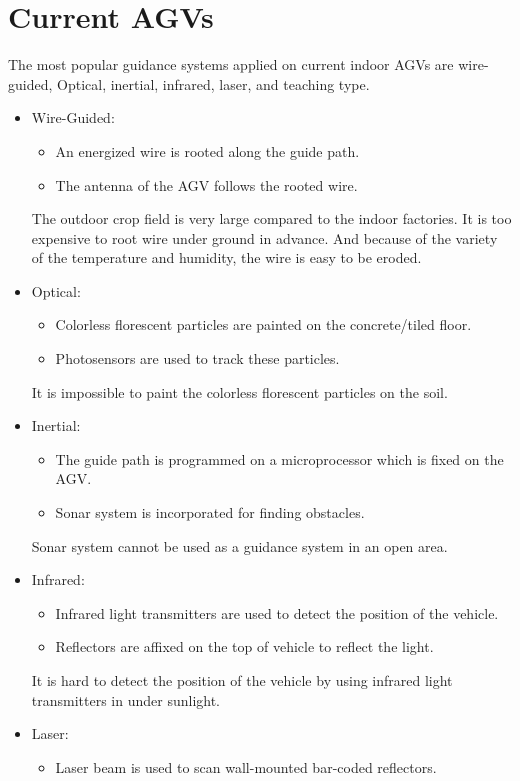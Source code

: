 \documentclass[letterpaper,12pt,oneside]{book}
\begin{document}
		\section{Current AGVs}
		The most popular guidance systems applied on current indoor AGVs are wire-guided, Optical, inertial, infrared, laser, and teaching type. \cite{KESH}
		\begin{itemize}
			\item Wire-Guided:
			\begin{itemize}
				\item An energized wire is rooted along the guide path. 
				\item The antenna of the AGV follows the rooted wire.
			\end{itemize}
			The outdoor crop field is very large compared to the indoor factories. It is too expensive to root wire under ground in advance. And because of the variety of the temperature and humidity, the wire is easy to be eroded.
			\item Optical:
			\begin{itemize}
				\item Colorless florescent particles are painted on the concrete/tiled floor. 
				\item Photosensors are used to track these particles.
			\end{itemize}
			It is impossible to paint the colorless florescent particles on the soil.
			\item Inertial:
			\begin{itemize}
				\item The guide path is programmed on a microprocessor which is fixed on the AGV. 
				\item Sonar system is incorporated for finding obstacles.
			\end{itemize}
			Sonar system cannot be used as a guidance system in an open area.
			\item Infrared:
			\begin{itemize}
				\item Infrared light transmitters are used to detect the position of the vehicle.
				\item Reflectors are affixed on the top of vehicle to reflect the light.
			\end{itemize}
			It is hard to detect the position of the vehicle by using infrared light transmitters in under sunlight.
			\item Laser:
			\begin{itemize}
				\item Laser beam is used to scan wall-mounted bar-coded reflectors.

\end{itemize}
\end{itemize}
\end{document}
